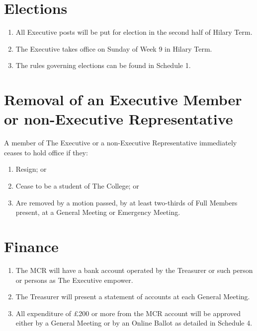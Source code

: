 \documentclass[11pt, a4paper]{article}
\begin{document}
\section{Elections}
\label{sec:elections}

\begin{enumerate}
	\item All Executive posts will be put for election in the second half of Hilary Term.
    \item The Executive takes office on Sunday of Week 9 in Hilary Term.
    \item The rules governing elections can be found in Schedule 1.
\end{enumerate}





\section{Removal of an Executive Member or non-Executive Representative}
\label{sec:removal_committee}

A member of The Executive or a non-Executive Representative immediately ceases to hold office if they:

\begin{enumerate}
	\item Resign; or
    \item Cease to be a student of The College; or
    \item Are removed by a motion passed, by at least two-thirds of Full Members present, at a General Meeting or Emergency Meeting.
\end{enumerate}





\section{Finance}
\label{sec:finance}

\begin{enumerate}
	\item The MCR will have a bank account operated by the Treasurer or such person or persons as The Executive empower.
    \item The Treasurer will present a statement of accounts at each General Meeting.
    \item All expenditure of \pounds200 or more from the MCR account will be approved either by a General Meeting or by an Online Ballot as detailed in Schedule 4.
\end{enumerate}
\end{document}
